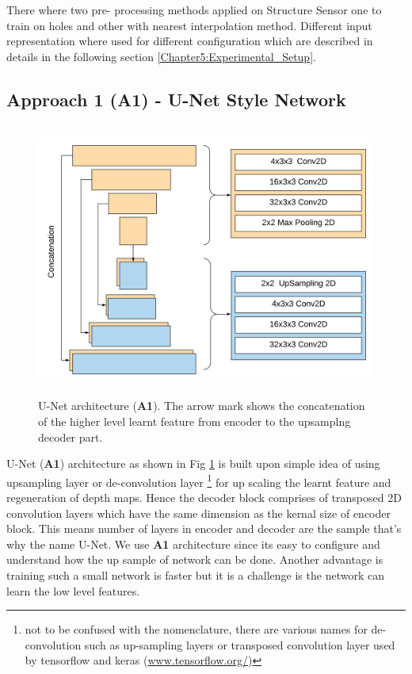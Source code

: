 There where two pre- processing methods applied on Structure Sensor one to train on holes and other with nearest interpolation method. Different input representation where used for different configuration which are described in details in the following section \ref{Chapter5:Experimental_Setup}.

\subsection{Approach 1 (A1) - U-Net Style Network}
\label{Chapter5:A1}
\begin{figure}[t]
    \centering
    \includegraphics[width = 14cm, height = 9cm]{Figures/A1.png}
    \caption{U-Net architecture (\textbf{A1}). The arrow mark shows the concatenation of the higher level learnt feature from encoder to the upsamplng decoder part.}
    \label{fig:A1-U-NetArchetecture}
\end{figure}{}

U-Net (\textbf{A1}) architecture as shown in Fig \ref{fig:A1-U-NetArchetecture} is built upon simple idea of using upsampling layer or de-convolution layer  \footnote{not to be confused with the nomenclature, there are various names for de-convolution such as up-sampling layers or transposed convolution layer used by tensorflow and keras (\url{www.tensorflow.org/})} for up scaling the learnt feature and regeneration of depth maps. Hence the decoder block comprises of transposed 2D convolution layers which have the same dimension as the kernal size of encoder block. This means number of layers in encoder and decoder are the sample that's why the name U-Net. We use \textbf{A1} architecture since its easy to configure and understand how the up sample of network can be done. Another advantage is training such a small network is faster but it is a challenge is the network can learn the low level features. 

